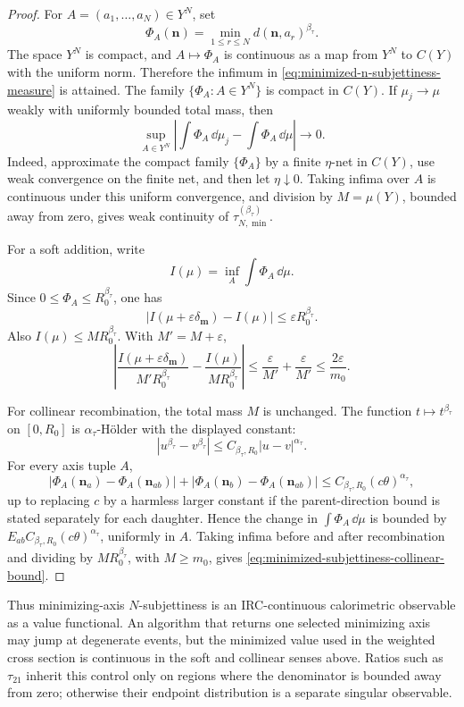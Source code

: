 \begin{proof}
For \(A=(a_1,\ldots,a_N)\in Y^N\), set
\[
  \Phi_A(\mathbf n)=\min_{1\le r\le N}d(\mathbf n,a_r)^{\beta_\tau}.
\]
The space \(Y^N\) is compact, and \(A\mapsto\Phi_A\) is continuous as a map
from \(Y^N\) to \(C(Y)\) with the uniform norm.  Therefore the infimum in
\eqref{eq:minimized-n-subjettiness-measure} is attained.  The family
\(\{\Phi_A:A\in Y^N\}\) is compact in \(C(Y)\).  If \(\mu_j\to\mu\) weakly
with uniformly bounded total mass, then
\[
  \sup_{A\in Y^N}
  \left|
  \int\Phi_A\,\dd\mu_j-\int\Phi_A\,\dd\mu
  \right|\longrightarrow0 .
\]
Indeed, approximate the compact family \(\{\Phi_A\}\) by a finite
\(\eta\)-net in \(C(Y)\), use weak convergence on the finite net, and then
let \(\eta\downarrow0\).  Taking infima over \(A\) is continuous under this
uniform convergence, and division by \(M=\mu(Y)\), bounded away from zero,
gives weak continuity of \(\tau_{N,\min}^{(\beta_\tau)}\).

For a soft addition, write
\[
  I(\mu)=\inf_A\int\Phi_A\,\dd\mu .
\]
Since \(0\le\Phi_A\le R_0^{\beta_\tau}\), one has
\[
  |I(\mu+\varepsilon\delta_{\mathbf m})-I(\mu)|
  \le \varepsilon R_0^{\beta_\tau}.
\]
Also \(I(\mu)\le M R_0^{\beta_\tau}\).  With
\(M' = M+\varepsilon\),
\[
  \left|
  \frac{I(\mu+\varepsilon\delta_{\mathbf m})}{M'R_0^{\beta_\tau}}
  -
  \frac{I(\mu)}{MR_0^{\beta_\tau}}
  \right|
  \le
  \frac{\varepsilon}{M'}+
  \frac{\varepsilon}{M'}
  \le \frac{2\varepsilon}{m_0}.
\]

For collinear recombination, the total mass \(M\) is unchanged.  The function
\(t\mapsto t^{\beta_\tau}\) on \([0,R_0]\) is
\(\alpha_\tau\)-Hölder with the displayed constant:
\[
  |u^{\beta_\tau}-v^{\beta_\tau}|
  \le C_{\beta_\tau,R_0}|u-v|^{\alpha_\tau}.
\]
For every axis tuple \(A\),
\[
  |\Phi_A(\mathbf n_a)-\Phi_A(\mathbf n_{ab})|
  +
  |\Phi_A(\mathbf n_b)-\Phi_A(\mathbf n_{ab})|
  \le C_{\beta_\tau,R_0}(c\theta)^{\alpha_\tau},
\]
up to replacing \(c\) by a harmless larger constant if the parent-direction
bound is stated separately for each daughter.  Hence the change in
\(\int\Phi_A\,\dd\mu\) is bounded by
\(E_{ab}C_{\beta_\tau,R_0}(c\theta)^{\alpha_\tau}\), uniformly in \(A\).
Taking infima before and after recombination and dividing by
\(MR_0^{\beta_\tau}\), with \(M\ge m_0\), gives
\eqref{eq:minimized-subjettiness-collinear-bound}.
\end{proof}

Thus minimizing-axis \(N\)-subjettiness is an IRC-continuous calorimetric
observable as a value functional.  An algorithm that returns one selected
minimizing axis may jump at degenerate events, but the minimized value used
in the weighted cross section is continuous in the soft and collinear senses
above.  Ratios such as \(\tau_{21}\) inherit this control only on regions
where the denominator is bounded away from zero; otherwise their endpoint
distribution is a separate singular observable.

